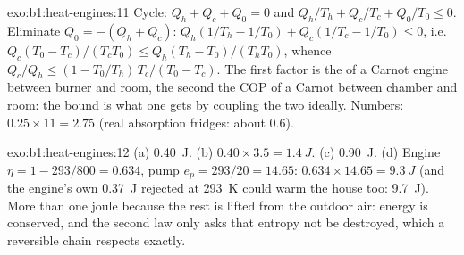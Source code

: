 \begin{solution}{exo:b1:heat-engines:11}
Cycle: $Q_h + Q_c + Q_0 = 0$ and $Q_h/T_h + Q_c/T_c + Q_0/T_0 \leq 0$.
Eliminate $Q_0 = -(Q_h + Q_c)$: $Q_h(1/T_h - 1/T_0) + Q_c(1/T_c - 1/T_0) \leq 0$,
i.e.\ $Q_c(T_0 - T_c)/(T_cT_0) \leq Q_h(T_h - T_0)/(T_hT_0)$, whence
$Q_c/Q_h \leq (1 - T_0/T_h)\,T_c/(T_0 - T_c)$. The first factor is the
 of a Carnot engine between burner and room, the second the
COP of a Carnot  between chamber and room: the bound is what
one gets by coupling the two ideally. Numbers: $0.25 \times 11 = 2.75$
(real absorption fridges: about $0.6$).
\end{solution}

\begin{solution}{exo:b1:heat-engines:12}
(a) \qty{0.40}{J}. (b) $0.40 \times 3.5 = \qty{1.4}{J}$. (c) \qty{0.90}{J}.
(d) Engine $\eta = 1 - 293/800 = 0.634$, pump $e_p = 293/20 = 14.65$:
$0.634 \times 14.65 = \qty{9.3}{J}$ (and the engine's own \qty{0.37}{J}
rejected at \qty{293}{K} could warm the house too: \qty{9.7}{J}). More than
one joule because the rest is lifted from the outdoor air: energy is
conserved, and the second law only asks that entropy not be destroyed,
which a reversible chain respects exactly.
\end{solution}

